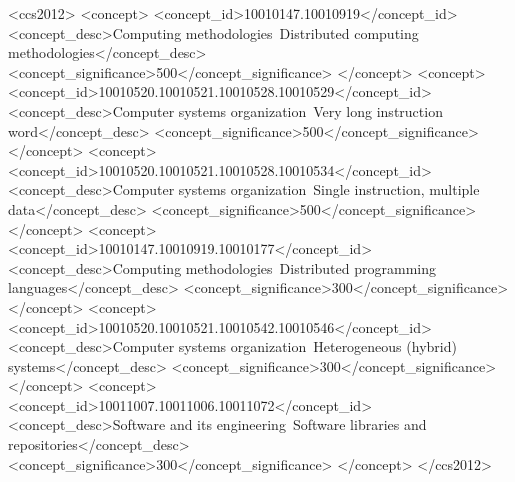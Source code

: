 \documentclass[sigconf,review]{acmart}
\begin{document}
%
\begin{CCSXML}
<ccs2012>
   <concept>
       <concept_id>10010147.10010919</concept_id>
       <concept_desc>Computing methodologies~Distributed computing methodologies</concept_desc>
       <concept_significance>500</concept_significance>
       </concept>
   <concept>
       <concept_id>10010520.10010521.10010528.10010529</concept_id>
       <concept_desc>Computer systems organization~Very long instruction word</concept_desc>
       <concept_significance>500</concept_significance>
       </concept>
   <concept>
       <concept_id>10010520.10010521.10010528.10010534</concept_id>
       <concept_desc>Computer systems organization~Single instruction, multiple data</concept_desc>
       <concept_significance>500</concept_significance>
       </concept>
   <concept>
       <concept_id>10010147.10010919.10010177</concept_id>
       <concept_desc>Computing methodologies~Distributed programming languages</concept_desc>
       <concept_significance>300</concept_significance>
       </concept>
   <concept>
       <concept_id>10010520.10010521.10010542.10010546</concept_id>
       <concept_desc>Computer systems organization~Heterogeneous (hybrid) systems</concept_desc>
       <concept_significance>300</concept_significance>
       </concept>
   <concept>
       <concept_id>10011007.10011006.10011072</concept_id>
       <concept_desc>Software and its engineering~Software libraries and repositories</concept_desc>
       <concept_significance>300</concept_significance>
       </concept>
 </ccs2012>
\end{CCSXML}


%
\maketitle
\end{document}
